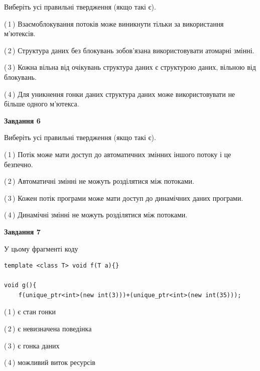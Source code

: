 \documentclass[12pt, ukrainian]{article}
\begin{document}
\begin {large}
{Виберіть усі правильні твердження (якщо такі є).\par
\vspace{2mm}

(\,1\,) Взаємоблокування потоків може виникнути тільки за використання м’ютексів.%

(\,2\,) Структура даних без блокувань зобов’язана використовувати атомарні змінні.%

(\,3\,) Кожна вільна від очікувань структура даних є структурою даних, вільною від блокувань.%

(\,4\,) Для уникнення гонки даних структура даних може використовувати не більше одного м’ютекса.%
\newpage


\begin{center}
\textbf{Завдання 6}
\end{center}

Виберіть усі правильні твердження (якщо такі є).\par
\vspace{2mm}

(\,1\,) Потік може мати доступ до автоматичних змінних іншого потоку і це безпечно.%

(\,2\,) Автоматичні змінні не можуть розділятися між потоками.%

(\,3\,) Кожен потік програми може мати доступ до динамічних даних програми.%

(\,4\,) Динамічні змінні не можуть розділятися між потоками.%


\begin{center}
\textbf{Завдання 7}
\end{center}

У цьому фрагменті коду
\begin{verbatim}
template <class T> void f(T a){}

void g(){
    f(unique_ptr<int>(new int(3)))+(unique_ptr<int>(new int(35)));
\end{verbatim}

(\,1\,) є стан гонки%

(\,2\,) є невизначена поведінка%

(\,3\,) є гонка даних%

(\,4\,) можливий виток ресурсів%

}
\end {large}

\vspace{4mm}
\newpage
\end{document}
